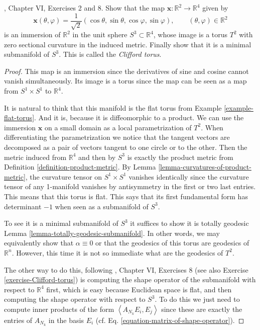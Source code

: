 \documentclass{book}
\begin{document}
\begin{exercise}
\label{exercise-Clifford-torus}
\cite{doc}, Chapter VI, Exercises 2 and 8.
Show that the map
$\mathbf{x}:\mathbb{R}^2\to\mathbb{R}^4$
given by
$$
\mathbf{x}(\theta,\varphi)
=\frac{1}{\sqrt{2}}(\cos\theta,\sin\theta,
\cos\varphi,\sin\varphi),
\qquad(\theta,\varphi)\in\mathbb{R}^2
$$
is an immersion of $\mathbb{R}^2$ in the unit
sphere $S^3\subset\mathbb{R}^4$,
whose image is a torus $T^2$ with zero
sectional curvature in the induced
metric. Finally show that it is a minimal
submanifold of $S^3$. This is called
the {\it Clifford torus}.
\end{exercise}

\begin{proof}
This map is an immersion since the
derivatives of sine and cosine cannot vanish
simultaneously. Its image is a torus since
the map can be seen as a map
from $S^1\times S^1$ to $\mathbb{R}^4$.

It is natural to think that this manifold is
the flat torus from Example
\ref{example-flat-torus}. And it is, because
it is diffeomorphic to a product.
We can use the immersion $\mathbf{x}$ on a
small domain as a local
parametrization of $T^2$.  When
differentiating the parametrization we notice
that the tangent vectors are decomposed as a
pair of vectors tangent to one
circle or to the other. Then the metric
induced from $\mathbb{R}^4$ and then by
$S^3$ is exactly the product metric from
Definition
\ref{definition-product-metric}. By Lemma
\ref{lemma-curvatures-of-product-metric}, the
curvature tensor on $S^1\times
S^1$ vanishes identically since the curvature
tensor of any 1-manifold vanishes
by antisymmetry in the first or two last
entries. This means that this torus is
flat. This says that its first fundamental
form has determinant $-1$ when seen
as a submanifold of $S^3$.

To see it is a minimal submanifold of $S^3$
it suffices to show it is totally
geodesic Lemma
\ref{lemma-totally-geodesic-submanifold}. In
other words, we may
equivalently show that $\alpha\equiv0$ or
that the geodesics of this torus are
geodesics of $\mathbb{R}^n$. However, this
time it is not so immediate what are
the geodesics of $T^2$.

The other way to do this, following
\cite{doc}, Chapter VI, Exercises 8 (see also
Exercise \ref{exercise-Clifford-torus}) is
computing the shape operator of the
submanifold with respect to $\mathbb{R}^4$
first, which is easy because
Euclidean space is flat, and then computing
the shape operator with respect to
$S^3$. To do this we just need to compute
inner products of the form
$\left\langle{}A_{N_k}E_i,E_j\right\rangle{}$ since these are
exactly the entries of $A_{N_k}$
in the basis $E_i$ (cf. Eq.
\ref{equation-matrix-of-shape-operator}).


\end{proof}
\end{document}
